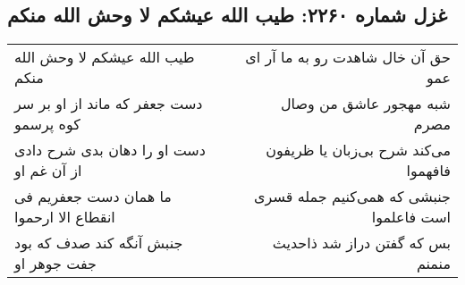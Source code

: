 \begin{center}
\section*{غزل شماره ۲۲۶۰: طیب الله عیشکم لا وحش الله منکم}
\label{sec:2260}
\begin{longtable}{l p{0.5cm} r}
طیب الله عیشکم لا وحش الله منکم
&&
حق آن خال شاهدت رو به ما آر ای عمو
\\
دست جعفر که ماند از او بر سر کوه پرسمو
&&
شبه مهجور عاشق من وصال مصرم
\\
دست او را دهان بدی شرح دادی از آن غم او
&&
می‌کند شرح بی‌زبان یا ظریفون فافهموا
\\
ما همان دست جعفریم فی انقطاع الا ارحموا
&&
جنبشی که همی‌کنیم جمله قسری است فاعلموا
\\
جنبش آنگه کند صدف که بود جفت جوهر او
&&
بس که گفتن دراز شد ذاحدیث منمنم
\\
\end{longtable}
\end{center}
